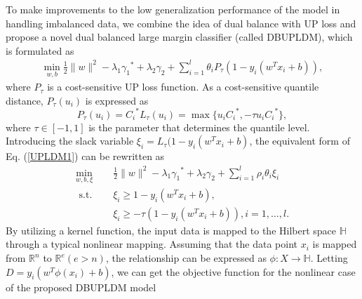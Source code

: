 \documentclass[a4paper]{cas-sc}
\begin{document}




To make improvements to the low generalization performance of the model in handling imbalanced data, we combine the idea of dual balance with UP loss and propose a novel dual balanced large margin classifier (called DBUPLDM), which is formulated as
\begin{equation}\label{UPLDM1}
\begin{aligned}
\min _{w, b} \frac{1}{2}\|w\|^{2} -\lambda_{1} {\gamma _1}^*+\lambda_{2} \gamma_{2}+ \sum_{i=1}^{l} \theta_{i}P_{\tau}\left(1-y_{i}\left(w^{T} x_{i}+b\right)\right),
\end{aligned}
\end{equation}
where $P_{\tau}$ is a cost-sensitive UP loss function. As a cost-sensitive quantile distance, $P_{\tau}(u_i)$ is expressed as
\begin{equation}\label{UP}
P_{\tau}(u_i)={C_i}^* L_{\tau}(u_i) =\max \{u_i{C_i}^*, -\tau u_i {C_i}^*\},
\end{equation}
where $\tau \in [-1,1]$ is the parameter that determines the quantile level. Introducing the slack variable $\xi_i=L_{\tau}(1-y_{i}(w^{T} x_{i}+b)$, the equivalent form of Eq. (\ref{UPLDM1}) can be rewritten as
\begin{equation}\label{DBUPLDM2}
\begin{aligned}
\min _{w,b,\xi} & \frac{1}{2}\|w\|^{2}-\lambda_{1} {\gamma _1}^*+\lambda_{2} \gamma_{2}+\sum_{i=1}^{l} \rho_{i}\theta_{i} \xi_{i} \\
\text { s.t. } \quad & \xi_{i} \geq 1-y_{i}\left(w^{T} x_{i}+b\right), \\
& \xi_{i} \geq-\tau\left(1-y_{i}\left(w^{T} x_{i}+b\right)\right), i=1, \ldots, l.
\end{aligned}
\end{equation}
By utilizing a kernel function, the input data is mapped to the Hilbert space $\mathbb{H}$ through a typical nonlinear mapping. Assuming that the data point ${x_i}$ is mapped from $\mathbb{R}^{n}$ to $\mathbb{R}^{e}(e>n)$, the relationship can be expressed as $\phi: X \rightarrow \mathbb{H}$. Letting $D=y_{i}\left(w^{T} \phi( x_{i})+b\right)$, we can get the objective function for the nonlinear case of the proposed DBUPLDM model
\end{document}
